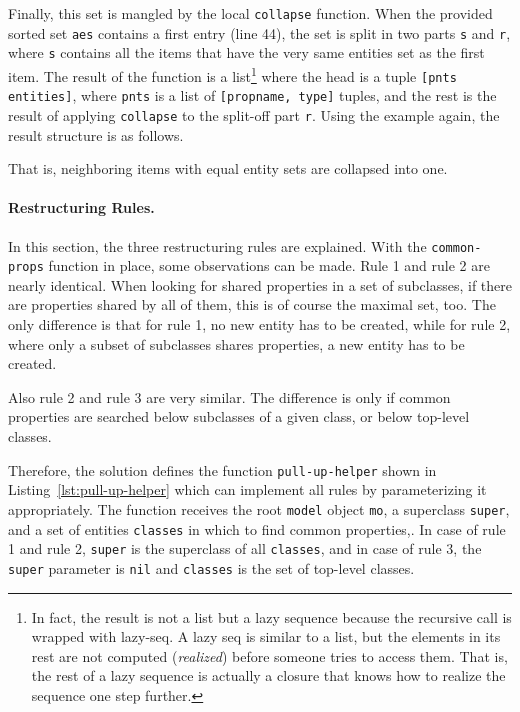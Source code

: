 \documentclass[submission]{eptcs}
\begin{document}
Finally, this set is mangled by the local \verb|collapse| function.  When the
provided sorted set \verb|aes| contains a first entry (line 44), the set is
split in two parts \verb|s| and \verb|r|, where \verb|s| contains all the items
that have the very same entities set as the first item.  The result of the
function is a list\footnote{In fact, the result is not a list but a lazy
  sequence because the recursive call is wrapped with \textsf{lazy-seq}.  A
  lazy seq is similar to a list, but the elements in its rest are not computed
  (\emph{realized}) before someone tries to access them.  That is, the rest of
  a lazy sequence is actually a closure that knows how to realize the sequence
  one step further.}  where the head is a tuple \verb|[pnts entities]|, where
\verb|pnts| is a list of \verb|[propname, type]| tuples, and the rest is the
result of applying \verb|collapse| to the split-off part \verb|r|.  Using the
example again, the result structure is as follows.

\begin{clojurecode*}{linenos=none}
([([pn2 t2])          #{e2 e3 e4 e5}]
 [([pn1 t1] [pn3 t2]) #{e1 e2 e3}]
 [([pn4 t2])          #{e2 e3 e4}]}
\end{clojurecode*}

That is, neighboring items with equal entity sets are collapsed into one.


\paragraph{Restructuring Rules.}

In this section, the three restructuring rules are explained.  With the
\verb|common-props| function in place, some observations can be made.  Rule 1
and rule 2 are nearly identical.  When looking for shared properties in a set
of subclasses, if there are properties shared by all of them, this is of course
the maximal set, too.  The only difference is that for rule 1, no new entity
has to be created, while for rule 2, where only a subset of subclasses shares
properties, a new entity has to be created.

Also rule 2 and rule 3 are very similar.  The difference is only if common
properties are searched below subclasses of a given class, or below top-level
classes.

Therefore, the solution defines the function \verb|pull-up-helper| shown in
Listing~\ref{lst:pull-up-helper} which can implement all rules by
parameterizing it appropriately.  The function receives the root \verb|model|
object \verb|mo|, a superclass \verb|super|, and a set of entities
\verb|classes| in which to find common properties,.  In case of rule 1 and rule
2, \verb|super| is the superclass of all \verb|classes|, and in case of rule 3,
the \verb|super| parameter is \verb|nil| and \verb|classes| is the set of
top-level classes.
\end{document}
